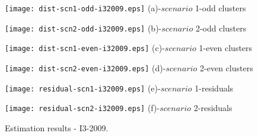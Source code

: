 \begin{figure}
     \begin{minipage}[h]{0.5\linewidth}
        \centering
        \texttt{[image: dist-scn1-odd-i32009.eps]}
				\footnotesize{(a)-$scenario$ 1-odd clusters}
     \end{minipage}
\vspace{3.00mm}
    \begin{minipage}[h]{0.5\linewidth}
       \centering
       \texttt{[image: dist-scn2-odd-i32009.eps]}
			\footnotesize{(b)-$scenario$ 2-odd clusters}
     \end{minipage}
\vspace{3.00mm}
    \begin{minipage}[h]{0.5\linewidth}
       \centering
       \texttt{[image: dist-scn1-even-i32009.eps]}
			\footnotesize{(c)-$scenario$ 1-even clusters}
     \end{minipage}
\vspace{3.00mm}
    \begin{minipage}[h]{0.5\linewidth}
       \centering
       \texttt{[image: dist-scn2-even-i32009.eps]}
			\footnotesize{(d)-$scenario$ 2-even clusters}
     \end{minipage}
\vspace{3.00mm}
    \begin{minipage}[h]{0.5\linewidth}
       \centering
       \texttt{[image: residual-scn1-i32009.eps]}
			\footnotesize{(e)-$scenario$ 1-residuals}
     \end{minipage}
\vspace{3.00mm}
    \begin{minipage}[h]{0.5\linewidth}
       \centering
       \texttt{[image: residual-scn2-i32009.eps]}
			\footnotesize{(f)-$scenario$ 2-residuals}
     \end{minipage}
		\caption{Estimation results - I3-2009.}
\label{fig12}
\end{figure}

